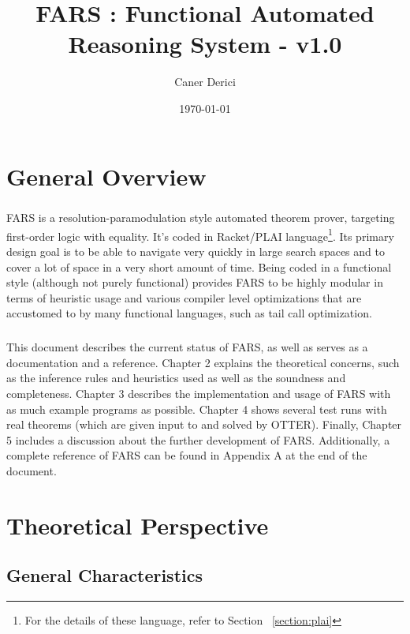 \documentclass[11pt]{report}
\title{FARS : Functional Automated Reasoning System - v1.0}
\date{\today}
\author{Caner Derici}
\begin{document}

\maketitle
\tableofcontents



\chapter{General Overview}
\setcounter{page}{1}

\paragraph{} FARS is a resolution-paramodulation style automated theorem prover, targeting first-order logic with equality. It's coded in Racket/PLAI language\footnote{For the details of these language, refer to Section ~\ref{section:plai}}. Its primary design goal is to be able to navigate very quickly in large search spaces and to cover a lot of space in a very short amount of time. Being coded in a functional style (although not purely functional) provides FARS to be highly modular in terms of heuristic usage and various compiler level optimizations that are accustomed to by many functional languages, such as tail call optimization.

\paragraph{} This document describes the current status of FARS, as well as serves as a documentation and a reference. Chapter 2 explains the theoretical concerns, such as the inference rules and heuristics used as well as the soundness and completeness. Chapter 3 describes the implementation and usage of FARS with as much example programs as possible. Chapter 4 shows several test runs with real theorems (which are given input to and solved by OTTER). Finally, Chapter 5 includes a discussion about the further development of FARS. Additionally, a complete reference of FARS can be found in Appendix A at the end of the document.

\chapter{Theoretical Perspective}

\section{General Characteristics}
\end{document}
